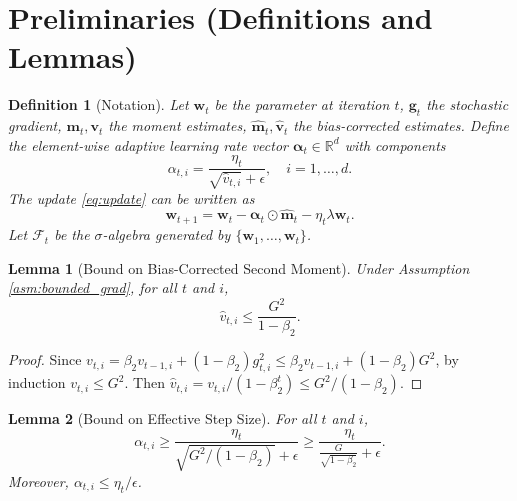 \documentclass{article}
\theoremstyle{plain}
\newtheorem{lemma}{Lemma}
\newtheorem{definition}{Definition}
\theoremstyle{definition}
\renewcommand{\vec}[1]{\boldsymbol{#1}}
\newcommand{\R}{\mathbb{R}}
\begin{document}
\section*{Preliminaries (Definitions and Lemmas)}

\begin{definition}[Notation]
Let $\vec{w}_t$ be the parameter at iteration $t$, $\vec{g}_t$ the stochastic gradient, $\vec{m}_t, \vec{v}_t$ the moment estimates, $\hat{\vec{m}}_t, \hat{\vec{v}}_t$ the bias-corrected estimates. Define the element-wise adaptive learning rate vector $\vec{\alpha}_t \in \R^d$ with components
\begin{equation}
    \alpha_{t,i} = \frac{\eta_t}{\sqrt{\hat{v}_{t,i}} + \epsilon}, \quad i = 1,\dots,d.
\end{equation}
The update \eqref{eq:update} can be written as
\begin{equation}
    \vec{w}_{t+1} = \vec{w}_t - \vec{\alpha}_t \odot \hat{\vec{m}}_t - \eta_t \lambda \vec{w}_t.
\end{equation}
Let $\mathcal{F}_t$ be the $\sigma$-algebra generated by $\{\vec{w}_1, \dots, \vec{w}_t\}$.
\end{definition}

\begin{lemma}[Bound on Bias-Corrected Second Moment] \label{lem:v_hat_bound}
Under Assumption \ref{asm:bounded_grad}, for all $t$ and $i$,
\begin{equation}
    \hat{v}_{t,i} \le \frac{G^2}{1 - \beta_2}.
\end{equation}
\end{lemma}
\begin{proof}
Since $v_{t,i} = \beta_2 v_{t-1,i} + (1-\beta_2) g_{t,i}^2 \le \beta_2 v_{t-1,i} + (1-\beta_2) G^2$, by induction $v_{t,i} \le G^2$. Then $\hat{v}_{t,i} = v_{t,i} / (1-\beta_2^t) \le G^2 / (1-\beta_2)$.
\end{proof}

\begin{lemma}[Bound on Effective Step Size] \label{lem:alpha_bound}
For all $t$ and $i$,
\begin{equation}
    \alpha_{t,i} \ge \frac{\eta_t}{\sqrt{G^2/(1-\beta_2)} + \epsilon} \ge \frac{\eta_t}{\frac{G}{\sqrt{1-\beta_2}} + \epsilon}.
\end{equation}
Moreover, $\alpha_{t,i} \le \eta_t / \epsilon$.
\end{lemma}
\end{document}
